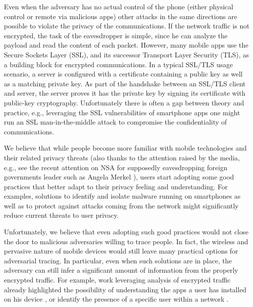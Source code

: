 \documentclass{acm_proc_article-sp}
\newcommand{\hilight}[1]{#1}
\begin{document}
Even when the adversary has no actual control of the phone (either physical control or remote via malicious apps) other attacks in the same directions are possible to violate the privacy of the communications. 
If the network traffic is not encrypted, the task of the eavesdropper is simple, since he can analyze the payload and read the content of each packet. However, many mobile apps use the \hilight{Secure Sockets Layer (SSL), and its successor Transport Layer  Security (TLS),} as a building block for encrypted communications.
In a typical SSL/TLS usage scenario, a server is configured with a certificate 
containing a public key as well as a matching private key. As part of the 
handshake between an SSL/TLS client and server, the server proves it has the 
private key by signing its certificate with public-key cryptography. 
Unfortunately there is often a gap between theory and practice, e.g., leveraging the SSL vulnerabilities of smartphone apps \cite{Fahl:2012:WEM:2382196.2382205,Georgiev:2012:MDC:2382196.2382204} one might run an SSL man-in-the-middle attack to compromise the confidentiality of communications. 


We believe that while people become more familiar with mobile technologies and their related privacy threats (also thanks to the attention raised by the media, e.g., see the recent attention on NSA for supposedly eavesdropping foreign governments leader such as Angela Merkel \cite{angelaTrack:14}), users start adopting some good practices that better adapt to their privacy feeling and understanding. For examples, solutions to identify and isolate malware running on smartphones \cite{InfFlow-TIFS,MOSES-TPDS,survey13suarez} as well as to protect against attacks coming from the network \cite{DBLP:ContiDG13mithys,LeoneConti.6732964} might significantly reduce current threats to user privacy.

Unfortunately, we believe that even adopting such good practices would not close the door to malicious adversaries willing to trace people. In fact, the wireless and pervasive nature of mobile devices would still leave many practical options for adversarial tracing. 
In particular, even when such solutions are in place, the adversary can still infer a significant amount of information from the properly encrypted traffic.
For example, work leveraging analysis of encrypted traffic already highlighted the possibility of understanding the apps a user has installed on his device \cite{Stober:2013:YSY:2462096.2462099}, or identify the presence of a specific user within a network \cite{NinoVerdeNATleftBehind}.
\end{document}
